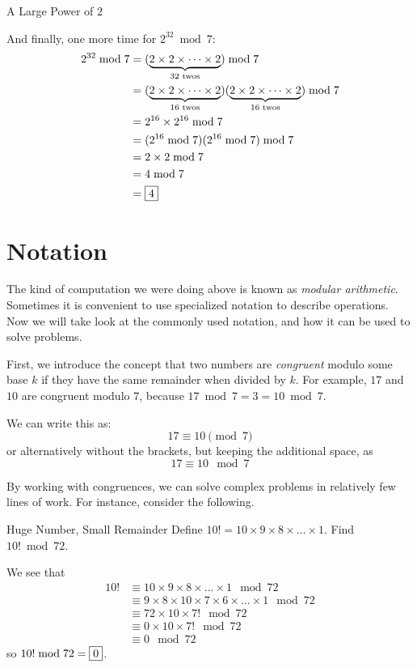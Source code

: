 \documentclass[a4paper,10pt]{report}
\begin{document}
\begin{problem}{A Large Power of $2$}
\begin{solution}
  And finally, one more time for $2^{32} \bmod 7$: \begin{align*}
   2^{32} \bmod 7
   &= (\underbrace{2 \times 2 \times \dots \times 2}_{32\text{ twos}}) \bmod 7 \\
   &= (\underbrace{2 \times 2 \times \dots \times 2}_{16\text{ twos}})
   (\underbrace{2 \times 2 \times \dots \times 2}_{16\text{ twos}}) \bmod 7 \\
   &= 2^{16}\times2^{16} \bmod 7 \\
   &= (2^{16} \bmod 7)(2^{16} \bmod 7) \bmod 7 \\
   &= 2 \times 2 \bmod 7 \\
   &= 4 \bmod 7 \\
   &= \Ans{4}
  \end{align*}

 \end{solution}
\end{problem}

\section{Notation}

The kind of computation we were doing above is known as \emph{modular
arithmetic}. Sometimes it is convenient to use specialized notation to describe
operations. Now we will take look at the commonly used notation, and how it can
be used to solve problems.

First, we introduce the concept that two numbers are \emph{congruent} modulo
some base $k$ if they have the same remainder when divided by $k$. For example,
$17$ and $10$ are congruent modulo $7$, because $17 \bmod 7 = 3 = 10 \bmod 7$.

We can write this as: \[
 17 \equiv 10 \pmod 7
\]
or alternatively without the brackets, but keeping the additional space, as \[
 17 \equiv 10 \mod 7
\]

By working with congruences, we can solve complex problems in relatively few
lines of work. For instance, consider the following.

\begin{problem}{Huge Number, Small Remainder}
 Define $10! = 10 \times 9 \times 8 \times \dots \times 1$. Find $10! \bmod 72$.

 \begin{solution}
  We see that \begin{align*}
   10!
   &\equiv 10 \times 9 \times 8 \times \dots \times 1 \mod {72} \\
   &\equiv 9 \times 8 \times 10 \times 7 \times 6 \times \dots \times 1
   \mod {72} \\
   &\equiv 72 \times 10 \times 7! \mod {72} \\
   &\equiv 0 \times 10 \times 7! \mod {72} \\
   &\equiv 0 \mod {72}
  \end{align*}
  so $10! \bmod 72 = \Ans{0}$.
 \end{solution}
\end{problem}
\end{document}

